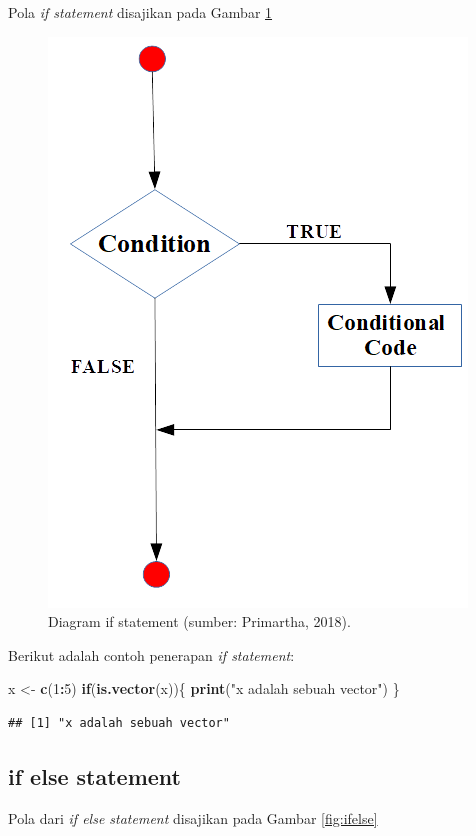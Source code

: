 \documentclass[]{book}
\newenvironment{Shaded}{\begin{snugshade}}{\end{snugshade}}
\newcommand{\KeywordTok}[1]{\textcolor[rgb]{0.13,0.29,0.53}{\textbf{#1}}}
\newcommand{\DecValTok}[1]{\textcolor[rgb]{0.00,0.00,0.81}{#1}}
\newcommand{\StringTok}[1]{\textcolor[rgb]{0.31,0.60,0.02}{#1}}
\newcommand{\ControlFlowTok}[1]{\textcolor[rgb]{0.13,0.29,0.53}{\textbf{#1}}}
\newcommand{\OperatorTok}[1]{\textcolor[rgb]{0.81,0.36,0.00}{\textbf{#1}}}
\newcommand{\NormalTok}[1]{#1}
\begin{document}
Pola \emph{if statement} disajikan pada Gambar \ref{fig:ifstatement}

\begin{figure}

{\centering \includegraphics[width=0.4\linewidth]{ifstatement} 

}

\caption{Diagram if statement (sumber: Primartha, 2018).}\label{fig:ifstatement}
\end{figure}

Berikut adalah contoh penerapan \emph{if statement}:

\begin{Shaded}
\begin{Highlighting}[]
\NormalTok{x <-}\StringTok{ }\KeywordTok{c}\NormalTok{(}\DecValTok{1}\OperatorTok{:}\DecValTok{5}\NormalTok{)}
\ControlFlowTok{if}\NormalTok{(}\KeywordTok{is.vector}\NormalTok{(x))\{}
  \KeywordTok{print}\NormalTok{(}\StringTok{"x adalah sebuah vector"}\NormalTok{)}
\NormalTok{\}}
\end{Highlighting}
\end{Shaded}

\begin{verbatim}
## [1] "x adalah sebuah vector"
\end{verbatim}

\subsection{if else statement}\label{if-else-statement}

Pola dari \emph{if else statement} disajikan pada Gambar
\ref{fig:ifelse}
\end{document}
